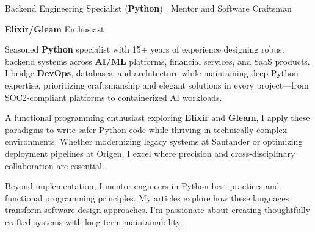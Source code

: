 \documentclass[a4paper,10pt]{article}
\title{\doctitle}
\begin{document}
	\noindent
	\begin{minipage}{\textwidth}
		{\Large{}\selectfont Backend Engineering Specialist (\textbf{Python}) | Mentor and Software Craftsman}

		{\small{}\selectfont \textbf{Elixir/Gleam} Enthusiast}
		\vspace{0.5cm}
	\end{minipage}

	\noindent
	\begin{minipage}[t]{0.7\textwidth}
		\vspace{0pt}
		\justifying

		Seasoned \textbf{Python} specialist with 15+ years of experience designing robust backend systems
		across \textbf{AI/ML} platforms, financial services, and SaaS products. I bridge \textbf{DevOps},
		databases, and architecture while maintaining deep Python expertise, prioritizing
		craftsmanship and elegant solutions in every project—from SOC2-compliant platforms to
		containerized AI workloads.
		\vspace{0.55cm}

		A functional programming enthusiast exploring \textbf{Elixir} and \textbf{Gleam}, I apply these paradigms
		to write safer Python code while thriving in technically complex environments. Whether
		modernizing legacy systems at Santander or optimizing deployment pipelines at Origen, I
		excel where precision and cross-disciplinary collaboration are essential.
		\vspace{0.55cm}

		Beyond implementation, I mentor engineers in Python best practices and functional
		programming principles. My articles explore how these
		languages transform software design approaches. I'm passionate about creating
		thoughtfully crafted systems with long-term maintainability.

	\end{minipage}%
	\hfill%
\end{document}
